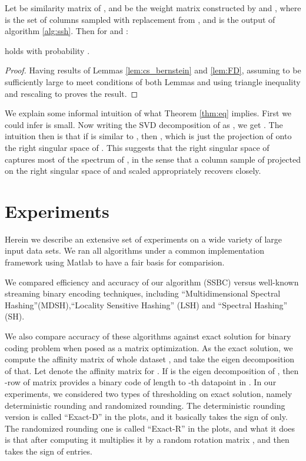 \documentclass{sig-alternate}
\begin{document}
\begin{theorem}\label{thm:eq}
Let  be similarity matrix of , and  be the weight matrix constructed by  and , where  is the set of columns sampled with replacement from , and  is the output of algorithm \ref{alg:ssh}. Then for  and :

holds with probability .
\end{theorem}
\begin{proof}
Having results of Lemmas \ref{lem:cs_bernstein} and \ref{lem:FD}, assuming  to be sufficiently large to meet conditions of both Lemmas and using triangle inequality and rescaling  to  proves the result.
\end{proof}

We explain some informal intuition of what Theorem \ref{thm:eq} implies. First we could infer  
is small.  Now writing the SVD decomposition of 
 as , we get . The intuition then is that if  is similar to , then , which is just the projection of  onto the right singular space of . 
This suggests that the right singular space of  captures most of the spectrum of , in the sense that a column sample of  projected on the right singular space of  and scaled appropriately recovers  closely. 

\section{Experiments}
\label{sec:exp}
Herein we describe an extensive set of experiments on a wide variety of large input data sets.
We ran all algorithms under a common implementation framework using Matlab to have a fair basis for comparision.

We compared efficiency and accuracy of our algorithm (SSBC) versus well-known streaming binary encoding techniques, including ``Multidimensional Spectral Hashing''(MDSH)\cite{weiss2012multidimensional},``Locality Sensitive Hashing'' (LSH)\cite{datar2004locality} and ``Spectral Hashing'' (SH)\cite{weiss2009spectral}.

We also compare accuracy of these algorithms against exact solution for binary coding problem when posed as a matrix optimization. As the exact solution, we compute the affinity matrix of whole dataset , and take the eigen decomposition of that. Let  denote the affinity matrix for . If  is the eigen decomposition of , then -row of  matrix provides a binary code of length  to -th datapoint in . In our experiments, we considered two types of thresholding on exact solution, namely deterministic rounding and randomized rounding. The deterministic rounding version is called ``Exact-D'' in the plots, and it basically takes the sign of  only. The randomized rounding one is called ``Exact-R'' in the plots, and what it does is that after computing  it multiplies it by a random rotation matrix , and then takes the sign of entries. 
\end{document}
